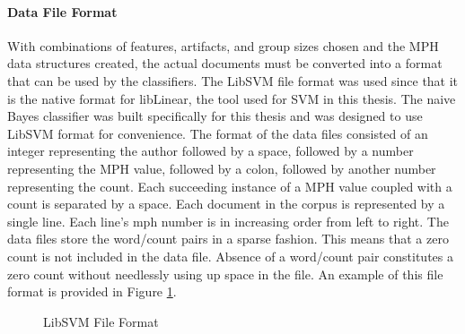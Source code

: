 		\paragraph{Data File Format}With combinations of features, artifacts, and group sizes chosen and the MPH data structures created, the actual documents must be converted into a format that can be used by the classifiers. The LibSVM file format was used since that it is the native format for libLinear, the tool used for SVM in this thesis.  The naive Bayes classifier was built specifically for this thesis and was designed to use LibSVM format for convenience. The format of the data files consisted of an integer representing the author followed by a space, followed by a number representing the MPH value, followed by a colon, followed by another number representing the count.  Each succeeding instance of a MPH value coupled with a count is separated by a space.  Each document in the corpus is represented by a single line.  Each line's mph number is in increasing order from left to right.  The data files store the word/count pairs in a sparse fashion.  This means that a zero count is not included in the data file.  Absence of a word/count pair constitutes a zero count without needlessly using up space in the file.  An example of this file format is provided in Figure \ref{fig:svmFormat}.
		\begin{figure}[ht!]
			\begin{center}
				\caption{LibSVM File Format}
				\label{fig:svmFormat}
			\end{center}
		\end{figure}
	
	
	
